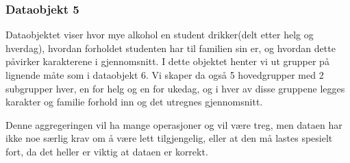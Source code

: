 \subsubsection{Dataobjekt 5}
Dataobjektet viser hvor mye alkohol en student drikker(delt etter helg og hverdag), hvordan forholdet studenten har til familien sin er, og hvordan dette påvirker karakterene i gjennomsnitt. I dette objektet henter vi ut grupper på lignende måte som i dataobjekt 6. Vi skaper da også 5 hovedgrupper med 2 subgrupper hver, en for helg og en for ukedag, og i hver av disse gruppene legges karakter og familie forhold inn og det utregnes gjennomsnitt. 

Denne aggregeringen vil ha mange operasjoner og vil være treg, men dataen har ikke noe særlig krav om å være lett tilgjengelig, eller at den må lastes spesielt fort, da det heller er viktig at dataen er korrekt.